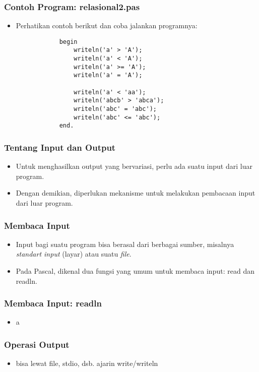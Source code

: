 \documentclass{beamer}
\begin{document}
\begin{frame}[fragile]
\frametitle{Contoh Program: relasional2.pas}
\begin{itemize}
	\item Perhatikan contoh berikut dan coba jalankan programnya:
		\begin{lstlisting}
			begin
			    writeln('a' > 'A');
			    writeln('a' < 'A');
			    writeln('a' >= 'A');
			    writeln('a' = 'A');

			    writeln('a' < 'aa');
			    writeln('abcb' > 'abca');
			    writeln('abc' = 'abc');
			    writeln('abc' <= 'abc');
			end.
		\end{lstlisting}
\end{itemize}
\end{frame}



\begin{frame}
\frametitle{Tentang Input dan Output}
\begin{itemize}
	\item Untuk menghasilkan output yang bervariasi, perlu ada suatu input dari luar program.
	\item Dengan demikian, diperlukan mekanisme untuk melakukan pembacaan input dari luar program.
\end{itemize}
\end{frame}

\begin{frame}
\frametitle{Membaca Input}
\begin{itemize}
	\item Input bagi suatu program bisa berasal dari berbagai sumber, misalnya \textit{standart input} (layar) atau suatu \textit{file}.
	\item Pada Pascal, dikenal dua fungsi yang umum untuk membaca input: \alert{read} dan \alert{readln}.
\end{itemize}
\end{frame}

\begin{frame}
\frametitle{Membaca Input: readln}
\begin{itemize}
	\item a
\end{itemize}
\end{frame}

\begin{frame}
\frametitle{Operasi Output}
\begin{itemize}
	\item bisa lewat file, stdio, dsb. ajarin write/writeln
\end{itemize}
\end{frame}
\end{document}
